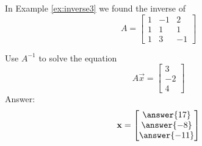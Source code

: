 \documentclass{ximera}
\begin{document}
\begin{problem}\label{prob:solvesysbyinverses}
In Example \ref{ex:inverse3} we found the inverse of $$A=\begin{bmatrix}1&-1&2\\1&1&1\\1&3&-1\end{bmatrix}$$

Use $A^{-1}$ to solve the equation
$$A\vec{x}=\begin{bmatrix}3\\-2\\4\end{bmatrix}$$
Answer:
$$\vec{x}=\begin{bmatrix}\answer{17}\\\answer{-8}\\\answer{-11}\end{bmatrix}$$

\end{problem}
\end{document}
